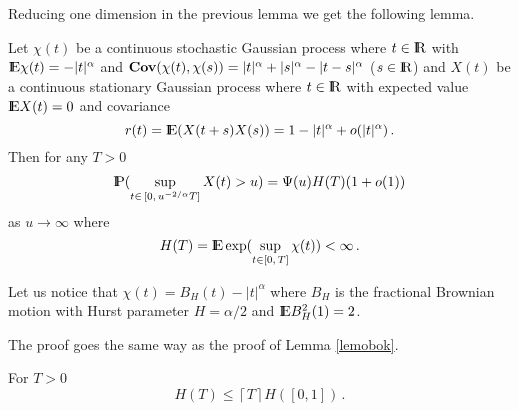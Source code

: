 Reducing one dimension in the previous lemma we get the following lemma.
\begin{lemma}\label{lemobok1}
Let $\chi(t)$ be a continuous stochastic Gaussian process where $t\in{\rm I\hspace{-0.8mm}R}$ with 
${\rm I\hspace{-0.8mm}E}\chi(t)=-|t|^\alpha$ and ${\bf Cov}(\chi(t),\chi(s))=|t|^\alpha+
|s|^\alpha-|t-s|^\alpha$ ($s\in{\rm I\hspace{-0.8mm}R}$) and $X(t)$ be a continuous stationary Gaussian 
process where $t\in{\rm I\hspace{-0.8mm}R}$ with expected value ${\rm I\hspace{-0.8mm}E} X(t)=0$ and covariance 
$$
r(t)={\rm I\hspace{-0.8mm}E}(X(t+s)X(s))=1-|t|^\alpha+o(|t|^\alpha)\,.
$$
Then for any $T>0$
$$
{\rm I\hspace{-0.8mm}P}(\sup_{t\in\, [0,\,u^{-2/\alpha}T]}X(t)>u)=\Psi(u)H(T)(1+o(1))
$$
as $u\rightarrow\infty$ where
\begin{equation}\label{defht}
H(T)={\rm I\hspace{-0.8mm}E}\exp(\sup_{t\in [0,\,T]}\chi(t))<\infty\,.
\end{equation}
\end{lemma}
\begin{remark}
Let us notice that $\chi(t)=B_H(t)-|t|^\alpha$ where $B_H$ is the fractional Brownian motion
with Hurst parameter $H=\alpha/2$ and ${\rm I\hspace{-0.8mm}E} B_H^2(1)=2$. 
\end{remark}
\proof
The proof goes the same way as the proof of Lemma \ref{lemobok}.
\halmos

\begin{corollary}\label{estht1w}
For $T>0$
$$
H(T)\leq \left\lceil T \right\rceil
H([0,1])\,.
$$
\end{corollary}

